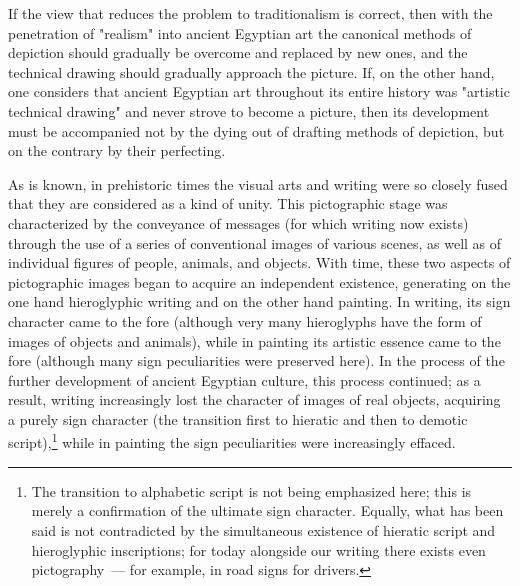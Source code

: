 If the view that reduces the problem to traditionalism is correct, then with the
penetration of "realism" into ancient Egyptian art the canonical methods of depiction
should gradually be overcome and replaced by new ones, and the technical drawing
should gradually approach the picture. If, on the other hand, one considers that ancient
Egyptian art throughout its entire history was "artistic technical drawing" and never
strove to become a picture, then its development must be accompanied not by the dying
out of drafting methods of depiction, but on the contrary by their perfecting.

As is known, in prehistoric times the visual arts and writing were so closely fused that
they are considered as a kind of unity. This pictographic stage was characterized by the
conveyance of messages (for which writing now exists) through the use of a series of
conventional images of various scenes, as well as of individual figures of people, animals,
and objects. With time, these two aspects of pictographic images began to acquire an
independent existence, generating on the one hand hieroglyphic writing and on the other
hand painting. In writing, its sign character came to the fore (although very many
hieroglyphs have the form of images of objects and animals), while in painting its artistic
essence came to the fore (although many sign peculiarities were preserved here). In the
process of the further development of ancient Egyptian culture, this process continued;
as a result, writing increasingly lost the character of images of real objects, acquiring a
purely sign character (the transition first to hieratic and then to demotic
script),\footnote{%
  The transition to alphabetic script is not being emphasized here; this is merely
  a confirmation of the ultimate sign character. Equally, what has been said is not
  contradicted by the simultaneous existence of hieratic script and hieroglyphic
  inscriptions; for today alongside our writing there exists even pictography~--- for
  example, in road signs for drivers.}
while in painting the sign peculiarities were increasingly effaced.


